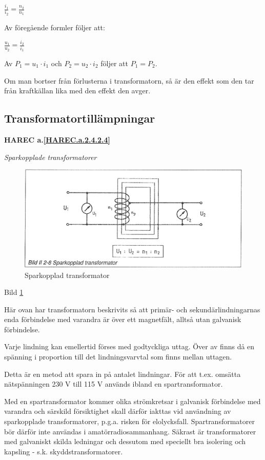 \(\frac{i_1}{i_2} = \frac{n_2}{n_1}\)

Av föregående formler följer att:

\(\frac{u_1}{u_2} = \frac{i_2}{i_1}\)

Av \(P_1 = u_1 \cdot i_1\) och \(P_2 = u_2 \cdot i_2\) följer att \(P_1 = P_2\).

Om man bortser från förlusterna i transformatorn, så är den effekt som den tar
från kraftkällan lika med den effekt den avger.

\subsection{Transformatortillämpningar}
\textbf{HAREC a.\ref{HAREC.a.2.4.2.4}\label{myHAREC.a.2.4.2.4}}

\emph{Sparkopplade transformatorer}

\begin{figure}[h]
\begin{center}
\includegraphics[width=14cm]{images/bild_2_2-08}
\caption{Sparkopplad transformator}
\label{fig:BildII2-8}
\end{center}
\end{figure}

Bild \ref{fig:BildII2-8}

Här ovan har transformatorn beskrivits så att primär- och sekundärlindningarnas
enda förbindelse med varandra är över ett magnetfält, alltså utan galvanisk
förbindelse.

Varje lindning kan emellertid förses med godtyckliga uttag. Över av finns då en
spänning i proportion till det lindningsvarvtal som finns mellan uttagen.

Detta är en metod att spara in på antalet lindningar. För att t.ex. omsätta
nätspänningen 230 V till 115 V används ibland en spartransformator.

Med en spartransformator kommer olika strömkretsar i galvanisk förbindelse med
varandra och särskild försiktighet skall därför iakttas vid användning av
sparkopplade transformatorer, p.g.a. risken för elolycksfall.
Spartransformatorer bör därför inte användas i amatörradiosammanhang. Säkrast
är transformatorer med galvaniskt skilda ledningar och dessutom med speciellt
bra isolering och kapsling - s.k. skyddstransformatorer.


